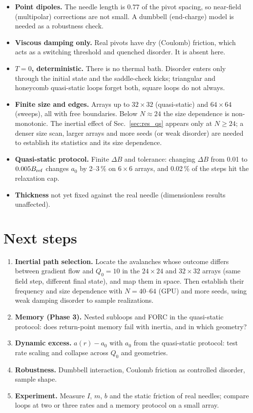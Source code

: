 \documentclass[11pt,a4paper]{article}
\begin{document}
\begin{itemize}[leftmargin=*]
\item \textbf{Point dipoles.} The needle length is $0.77$ of the pivot spacing, so near-field (multipolar) corrections are not small. A dumbbell (end-charge) model is needed as a robustness check.
\item \textbf{Viscous damping only.} Real pivots have dry (Coulomb) friction, which acts as a switching threshold and quenched disorder. It is absent here.
\item \textbf{$T=0$, deterministic.} There is no thermal bath. Disorder enters only through the initial state and the saddle-check kicks; triangular and honeycomb quasi-static loops forget both, square loops do not always.
\item \textbf{Finite size and edges.} Arrays up to $32\times32$ (quasi-static) and $64\times64$ (sweeps), all with free boundaries. Below $N\approx24$ the size dependence is non-monotonic. The inertial effect of Sec.~\ref{sec:res_qs} appears only at $N\ge24$; a denser size scan, larger arrays and more seeds (or weak disorder) are needed to establish its statistics and its size dependence.
\item \textbf{Quasi-static protocol.} Finite $\Delta B$ and tolerance: changing $\Delta B$ from 0.01 to $0.005B_{\rm ref}$ changes $a_0$ by 2--3\,\% on $6\times6$ arrays, and 0.02\,\% of the steps hit the relaxation cap.
\item \textbf{Thickness} not yet fixed against the real needle (dimensionless results unaffected).
\end{itemize}

\section{Next steps}
\label{sec:next}

\begin{enumerate}[leftmargin=*]
\item \textbf{Inertial path selection.} Locate the avalanches whose outcome differs between gradient flow and $Q_0=10$ in the $24\times24$ and $32\times32$ arrays (same field step, different final state), and map them in space. Then establish their frequency and size dependence with $N=40$--$64$ (GPU) and more seeds, using weak damping disorder to sample realizations.
\item \textbf{Memory (Phase 3).} Nested subloops and FORC in the quasi-static protocol: does return-point memory fail with inertia, and in which geometry?
\item \textbf{Dynamic excess.} $a(r)-a_0$ with $a_0$ from the quasi-static protocol: test rate scaling and collapse across $Q_0$ and geometries.
\item \textbf{Robustness.} Dumbbell interaction, Coulomb friction as controlled disorder, sample shape.
\item \textbf{Experiment.} Measure $I$, $m$, $b$ and the static friction of real needles; compare loops at two or three rates and a memory protocol on a small array.
\end{enumerate}
\end{document}
